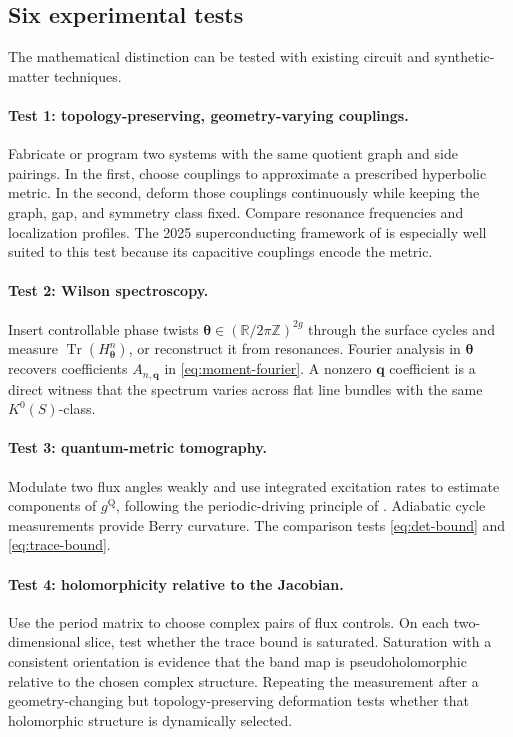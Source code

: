 \documentclass[11pt]{article}
\theoremstyle{definition}
\theoremstyle{remark}
\newcommand{\RR}{\mathbb R}
\newcommand{\ZZ}{\mathbb Z}
\newcommand{\Tr}{\operatorname{Tr}}
\begin{document}
\subsection{Six experimental tests}

The mathematical distinction can be tested with existing circuit and
synthetic-matter techniques.

\paragraph{Test 1: topology-preserving, geometry-varying couplings.}
Fabricate or program two systems with the same quotient graph and side
pairings.  In the first, choose couplings to approximate a prescribed
hyperbolic metric.  In the second, deform those couplings continuously while
keeping the graph, gap, and symmetry class fixed.  Compare resonance
frequencies and localization profiles.  The 2025 superconducting framework
of \cite{XuEtAl2025} is especially well suited to this test because its
capacitive couplings encode the metric.

\paragraph{Test 2: Wilson spectroscopy.}
Insert controllable phase twists
\(\bm\theta\in(\RR/2\pi\ZZ)^{2g}\) through the surface cycles and measure
\(\Tr(H_{\bm\theta}^n)\), or reconstruct it from resonances.  Fourier analysis
in \(\bm\theta\) recovers coefficients \(A_{n,\bm q}\) in
\eqref{eq:moment-fourier}.  A nonzero \(\bm q\) coefficient is a direct
witness that the spectrum varies across flat line bundles with the same
\(K^0(S)\)-class.

\paragraph{Test 3: quantum-metric tomography.}
Modulate two flux angles weakly and use integrated excitation rates to
estimate components of \(g^{\mathrm Q}\), following the periodic-driving
principle of \cite{OzawaGoldman}.  Adiabatic cycle measurements provide Berry
curvature.  The comparison tests \eqref{eq:det-bound} and
\eqref{eq:trace-bound}.

\paragraph{Test 4: holomorphicity relative to the Jacobian.}
Use the period matrix to choose complex pairs of flux controls.  On each
two-dimensional slice, test whether the trace bound is saturated.  Saturation
with a consistent orientation is evidence that the band map is
pseudoholomorphic relative to the chosen complex structure.  Repeating the
measurement after a geometry-changing but topology-preserving deformation
tests whether that holomorphic structure is dynamically selected.
\end{document}
